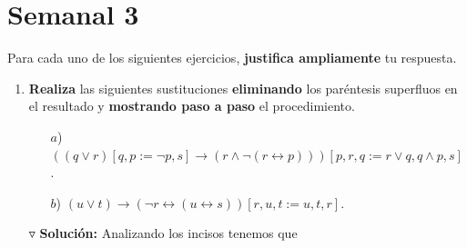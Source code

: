 \documentclass{article}
\begin{document}
\section*{\LARGE{Semanal 3}}
Para cada uno de los siguientes ejercicios, \textbf{justifica ampliamente} tu respuesta.
\begin{enumerate}
\item \textbf{Realiza} las siguientes sustituciones \textbf{eliminando} los paréntesis
  superfluos en el resultado y \textbf{mostrando paso a paso} el procedimiento.
  \begin{itemize}
  \item[$a$)] $((q \lor r)[q, p := \neg p, s] \rightarrow (r \land \neg(r \leftrightarrow p)))[p, r, q := r \lor q, q \land p, s]$.
  \item[$b$)] $(u \lor t) \rightarrow (\neg r \leftrightarrow (u \leftrightarrow s))[r, u, t := u, t, r]$.
  \end{itemize}
  $\triangledown$ \textbf{Solución:} Analizando los incisos tenemos que
  

\end{enumerate}
\end{document}

